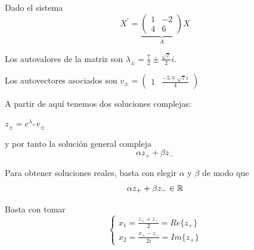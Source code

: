 \documentclass{mathnotes}
\begin{document}
\begin{example}[(Método 1)]
Dado el sistema $$X^\prime = \underbrace{\begin{pmatrix}
1 & -2\\ 4 & 6
\end{pmatrix}}_AX$$

Los autovalores de la matriz son $\lambda_\pm = \frac{7}{2} \pm \frac{\sqrt{7}}{2}i$.

Los autovectores asociados son $v_\pm = \begin{pmatrix}
1& \frac{-5\mp\sqrt{7}i}{4}
\end{pmatrix}$

A partir de aquí tenemos dos soluciones complejas:
\begin{center}
$z_\pm = e^{\lambda_\pm}v_\pm$
\end{center}

y por tanto la solución general compleja$$\alpha z_+ + \beta z_-$$

Para obtener soluciones reales, basta con elegir $\alpha$ y $\beta$ de modo que $$\alpha z_+ + \beta z_- \in \mathbb{R}$$

Basta con tomar \begin{equation*}
  \left\lbrace
  \begin{array}{l}
	x_1 = \frac{z_++z_-}{2} = Re\{ z_+ \}\\
	x_2 = \frac{x_+-z_-}{2i} = Im \{ z_+ \}
  \end{array}
  \right.
\end{equation*}
\end{example}
\end{document}

